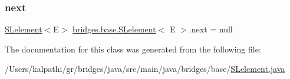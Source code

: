\subsubsection{\texorpdfstring{next}{next}}
{\footnotesize\ttfamily \mbox{\hyperlink{classbridges_1_1base_1_1_s_lelement}{S\+Lelement}}$<$E$>$ \mbox{\hyperlink{classbridges_1_1base_1_1_s_lelement}{bridges.\+base.\+S\+Lelement}}$<$ E $>$.next = null\hspace{0.3cm}{\ttfamily [protected]}}



The documentation for this class was generated from the following file\+:\begin{DoxyCompactItemize}
\item 
/\+Users/kalpathi/gr/bridges/java/src/main/java/bridges/base/\mbox{\hyperlink{_s_lelement_8java}{S\+Lelement.\+java}}\end{DoxyCompactItemize}
